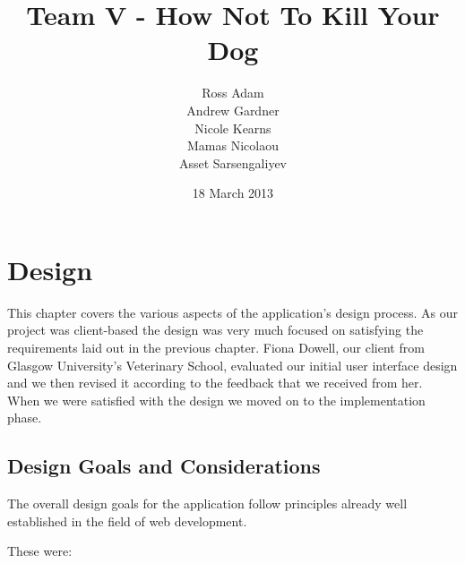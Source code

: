 \documentclass{l3proj}
\begin{document}
\title{Team V - How Not To Kill Your Dog}
\author{Ross Adam \\
        Andrew Gardner \\
        Nicole Kearns \\
        Mamas Nicolaou \\
        Asset Sarsengaliyev}
\date{18 March 2013}
\maketitle

\chapter{Design}
\label{design}

This chapter covers the various aspects of the application's design process. As our project was client-based the design was very much focused on satisfying the requirements laid out in the previous chapter. Fiona Dowell, our client from Glasgow University's Veterinary School, evaluated our initial user interface design and we then revised it according to the feedback that we received from her. When we were satisfied with the design we moved on to the implementation phase.

\newpage

\section{Design Goals and Considerations}

The overall design goals for the application follow principles already well established in the field of web development.

These were:
\end{document}
